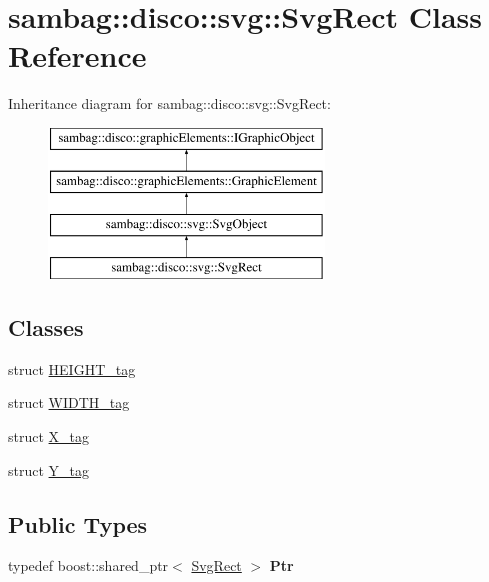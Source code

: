 \hypertarget{classsambag_1_1disco_1_1svg_1_1_svg_rect}{
\section{sambag::disco::svg::SvgRect Class Reference}
\label{classsambag_1_1disco_1_1svg_1_1_svg_rect}
}
Inheritance diagram for sambag::disco::svg::SvgRect:\begin{figure}[H]
\begin{center}
\leavevmode
\includegraphics[height=4.000000cm]{classsambag_1_1disco_1_1svg_1_1_svg_rect}
\end{center}
\end{figure}
\subsection*{Classes}
\begin{DoxyCompactItemize}
\item 
struct \hyperlink{structsambag_1_1disco_1_1svg_1_1_svg_rect_1_1_h_e_i_g_h_t__tag}{HEIGHT\_\-tag}
\item 
struct \hyperlink{structsambag_1_1disco_1_1svg_1_1_svg_rect_1_1_w_i_d_t_h__tag}{WIDTH\_\-tag}
\item 
struct \hyperlink{structsambag_1_1disco_1_1svg_1_1_svg_rect_1_1_x__tag}{X\_\-tag}
\item 
struct \hyperlink{structsambag_1_1disco_1_1svg_1_1_svg_rect_1_1_y__tag}{Y\_\-tag}
\end{DoxyCompactItemize}
\subsection*{Public Types}
\begin{DoxyCompactItemize}
\item 
\hypertarget{classsambag_1_1disco_1_1svg_1_1_svg_rect_a231b3759ec551e7a97e003fe654f76dd}{
typedef boost::shared\_\-ptr$<$ \hyperlink{classsambag_1_1disco_1_1svg_1_1_svg_rect}{SvgRect} $>$ {\bfseries Ptr}}
\label{classsambag_1_1disco_1_1svg_1_1_svg_rect_a231b3759ec551e7a97e003fe654f76dd}

\end{DoxyCompactItemize}
